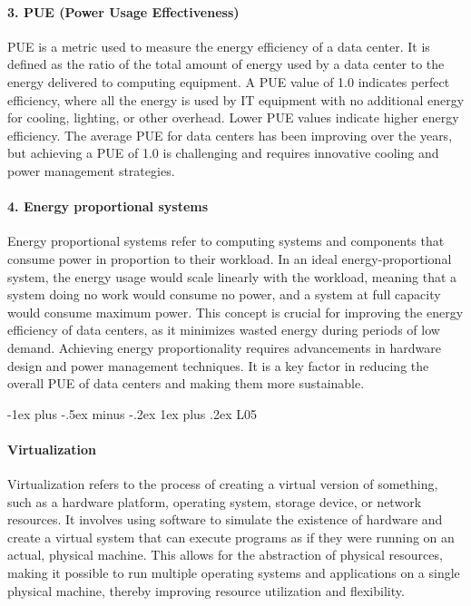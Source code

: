 \documentclass[10pt, landscape]{article}
\makeatletter
\renewcommand{\subsubsection}{\@startsection{subsubsection}{3}{0mm}%
  {-1ex plus -.5ex minus -.2ex}%
  {1ex plus .2ex}%
{\normalfont\small\bfseries}}%
\makeatother
\begin{document}
\begin{multicols*}{4}
\paragraph{3. PUE (Power Usage
Effectiveness)}\label{pue-power-usage-effectiveness}

PUE is a metric used to measure the energy efficiency of a data center.
It is defined as the ratio of the total amount of energy used by a data
center to the energy delivered to computing equipment. A PUE value of
1.0 indicates perfect efficiency, where all the energy is used by IT
equipment with no additional energy for cooling, lighting, or other
overhead. Lower PUE values indicate higher energy efficiency. The
average PUE for data centers has been improving over the years, but
achieving a PUE of 1.0 is challenging and requires innovative cooling
and power management strategies.

\paragraph{4. Energy proportional
systems}\label{energy-proportional-systems}

Energy proportional systems refer to computing systems and components
that consume power in proportion to their workload. In an ideal
energy-proportional system, the energy usage would scale linearly with
the workload, meaning that a system doing no work would consume no
power, and a system at full capacity would consume maximum power. This
concept is crucial for improving the energy efficiency of data centers,
as it minimizes wasted energy during periods of low demand. Achieving
energy proportionality requires advancements in hardware design and
power management techniques. It is a key factor in reducing the overall
PUE of data centers and making them more sustainable.

\subsubsection{L05}\label{l05}

\paragraph{Virtualization}\label{virtualization-1}

Virtualization refers to the process of creating a virtual version of
something, such as a hardware platform, operating system, storage
device, or network resources. It involves using software to simulate the
existence of hardware and create a virtual system that can execute
programs as if they were running on an actual, physical machine. This
allows for the abstraction of physical resources, making it possible to
run multiple operating systems and applications on a single physical
machine, thereby improving resource utilization and flexibility.


\end{multicols*}
\end{document}
